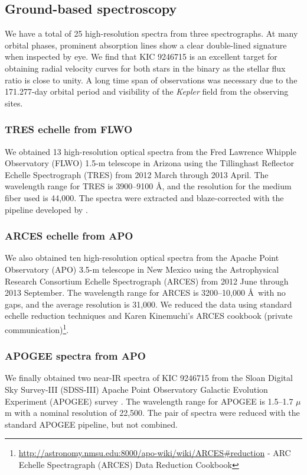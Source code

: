 \subsection{Ground-based spectroscopy}\label{spectra}
We have a total of 25 high-resolution spectra from three spectrographs. At many orbital phases, prominent absorption lines show a clear double-lined signature when inspected by eye. We find that KIC 9246715 is an excellent target for obtaining radial velocity curves for both stars in the binary as the stellar flux ratio is close to unity. A long time span of observations was necessary due to the 171.277-day orbital period and visibility of the \emph{Kepler} field from the observing sites.

\subsubsection{TRES echelle from FLWO}\label{tres}
We obtained 13 high-resolution optical spectra from the Fred Lawrence Whipple Observatory (FLWO) 1.5-m telescope in Arizona using the Tillinghast Reflector Echelle Spectrograph (TRES) from 2012 March through 2013 April. The wavelength range for TRES is 3900--9100 \AA, and the resolution for the medium fiber used is 44,000. The spectra were extracted and blaze-corrected with the pipeline developed by \citet{buc10}.

\subsubsection{ARCES echelle from APO}\label{arces}
We also obtained ten high-resolution optical spectra from the Apache Point Observatory (APO) 3.5-m telescope in New Mexico using the Astrophysical Research Consortium Echelle Spectrograph (ARCES) from 2012 June through 2013 September. The wavelength range for ARCES is 3200--10,000 \AA \ with no gaps, and the average resolution is 31,000. We reduced the data using standard echelle reduction techniques and Karen Kinemuchi's ARCES cookbook (private communication)\footnote{\url{http://astronomy.nmsu.edu:8000/apo-wiki/wiki/ARCES\#reduction} - ARC Echelle Spectragraph (ARCES) Data Reduction Cookbook}.

\subsubsection{APOGEE spectra from APO}\label{apogee}
We finally obtained two near-IR spectra of KIC 9246715 from the Sloan Digital Sky Survey-III (SDSS-III) Apache Point Observatory Galactic Evolution Experiment (APOGEE) survey \citep{2015arXiv150100963A}. The wavelength range for APOGEE is 1.5--1.7 $\mu$m with a nominal resolution of 22,500. The pair of spectra were reduced with the standard APOGEE pipeline, but not combined.


